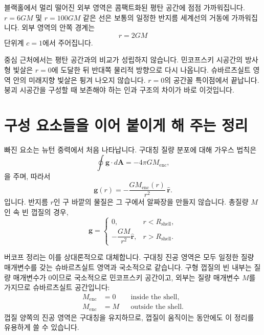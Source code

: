 블랙홀에서 멀리 떨어진 외부 영역은 콤팩트화된 평탄 공간에 점점 가까워집니다. \(r=6GM\) 및 \(r=100GM\) 같은 선은 보통의 일정한 반지름 세계선의 거동에 가까워집니다. 외부 영역의 안쪽 경계는
\begin{equation}
r=2GM
\end{equation}
단위계 \(c=1\)에서 주어집니다.

중심 근처에서는 평탄 공간과의 비교가 성립하지 않습니다. 민코프스키 시공간의 방사형 빛살은 \(r=0\)에 도달한 뒤 반대쪽 물리적 방향으로 다시 나옵니다. 슈바르츠실트 영역 안의 미래지향 빛살은 튕겨 나오지 않습니다. \(r=0\)의 공간꼴 특이점에서 끝납니다. 붕괴 시공간을 구성할 때 보존해야 하는 인과 구조의 차이가 바로 이것입니다.

\section{구성 요소들을 이어 붙이게 해 주는 정리}

빠진 요소는 뉴턴 중력에서 처음 나타납니다. 구대칭 질량 분포에 대해 가우스 법칙은
\begin{equation}
\oint\mathbf g\cdot d\mathbf A=-4\pi G M_{\mathrm{enc}},
\end{equation}
을 주며, 따라서
\begin{equation}
\mathbf g(r)=-\frac{G M_{\mathrm{enc}}(r)}{r^2}\,\hat{\mathbf r}.
\label{eq:l05-shell-theorem}
\end{equation}
입니다.
반지름 \(r\)인 구 바깥의 물질은 그 구에서 알짜장을 만들지 않습니다. 총질량 \(M\)인 속 빈 껍질의 경우,
\begin{equation}
\mathbf g=
\begin{cases}
0, & r<R_{\mathrm{shell}},\\[3pt]
-\dfrac{GM}{r^2}\hat{\mathbf r}, & r>R_{\mathrm{shell}}.
\end{cases}
\end{equation}

버코프 정리는 이를 상대론적으로 대체합니다. 구대칭 진공 영역은 모두 일정한 질량 매개변수를 갖는 슈바르츠실트 영역과 국소적으로 같습니다. 구형 껍질의 빈 내부는 질량 매개변수가 0이므로 국소적으로 민코프스키 공간이고, 외부는 질량 매개변수 \(M\)를 가지므로 슈바르츠실트 공간입니다:
\begin{equation}
\begin{aligned}
M_{\mathrm{enc}}&=0 && \text{inside the shell},\\
M_{\mathrm{enc}}&=M && \text{outside the shell}.
\end{aligned}
\label{eq:l05-birkhoff}
\end{equation}
껍질 양쪽의 진공 영역은 구대칭을 유지하므로, 껍질이 움직이는 동안에도 이 정리를 유용하게 쓸 수 있습니다.

